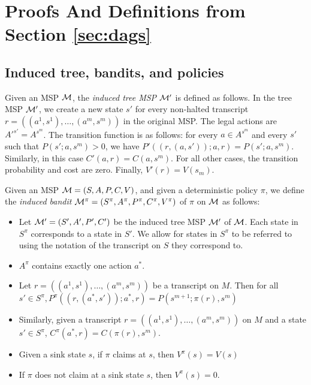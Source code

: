 \section{Proofs And Definitions from Section \ref{sec:dags}} \label{app:dags}

\subsection{Induced tree, bandits, and policies} \label{subapp:induced-policies}

\begin{definition} \label{def:tree-MSP}
  Given an MSP $\mathcal{M}$, the \emph{induced tree MSP} $\mathcal{M}'$ is defined as follows.
  In the tree MSP $\mathcal{M}'$, we create a new state $s'$ for every non-halted transcript $r=((a^1,s^1),\dots,(a^m,s^m))$ in the original MSP.
  The legal actions are $A'^{s'} = A^{s^m}$.
  The transition function is as follows: for every $a \in A^{s^m}$ and every $s'$ such that $P(s';a,s^m) > 0$, we have $P'((r,(a,s'));a,r) = P(s';a,s^m)$.
  Similarly, in this case $C'(a,r) = C(a,s^m)$.
  For all other cases, the transition probability and cost are zero.
  Finally, $V'(r) = V(s_m)$.
\end{definition}

\begin{definition} \label{def:induced-bandit}
  Given an MSP $\mathcal{M} = (S,A,P,C,V)$, and given a deterministic policy $\pi$, we define the \emph{induced bandit} $\mathcal{M}^{\pi}=(S^\pi,A^\pi,P^\pi,C^\pi,V^{\pi})$ of $\pi$ on $\mathcal{M}$ as follows:
  \begin{itemize}
    \item Let $\mathcal{M}'=(S',A',P',C')$ be the induced tree MSP $\mathcal{M}'$ of $\mathcal{M}$. Each state in $S^{\pi}$ corresponds to a state in $S'$.
    We allow for states in $S^{\pi}$ to be referred to using the notation of the transcript on $S$ they correspond to.
    \item $A^\pi$ contains exactly one action $a^*$.
    \item Let $r=((a^1,s^1),\ldots,(a^m,s^m))$ be a transcript on $M$.
    Then for all $s'\in S^\pi, P^\pi((r,(a^*,s'));a^*,r)=P(s^{m+1};\pi(r),s^m)$
    \item Similarly, given a transcript $r=((a^1,s^1),\ldots,(a^m,s^m))$ on $M$ and a state $s'\in S^\pi$,
    $C^\pi(a^*,r)=C(\pi(r),s^m)$.
    \item Given a sink state $s$, if $\pi$ claims at $s$, then $V^\pi(s)=V(s)$
    \item If $\pi$ does not claim at a sink state $s$, then $V^\pi(s)=0$.
  \end{itemize}
\end{definition}

